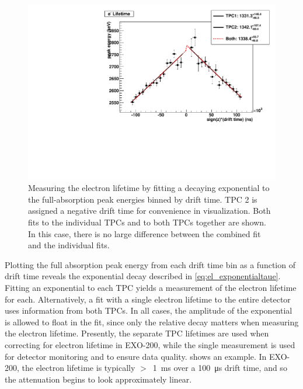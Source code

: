 \documentclass[herrin-thesis.tex]{subfiles}
\begin{document}
\begin{figure}[tbp]
\centering
\includegraphics[width=0.6\columnwidth]{./plots/el_run4228_fit.pdf}
\caption[A fit to the exponential attenuation of the full-absorption peak]{Measuring the electron lifetime by fitting a decaying exponential to the full-absorption peak energies binned by drift time. TPC 2 is assigned a negative drift time for convenience in visualization. Both fits to the individual TPCs and to both TPCs together are shown. In this case, there is no large difference between the combined fit and the individual fits.}
\label{fig:el_elfit}
\end{figure}

Plotting the full absorption peak energy from each drift time bin as a function of drift time reveals the exponential decay described in \cref{eq:el_exponentialtaue}. Fitting an exponential to each TPC yields a measurement of the electron lifetime for each. Alternatively, a fit with a single electron lifetime to the entire detector uses information from both TPCs. In all cases, the amplitude of the exponential is allowed to float in the fit, since only the relative decay matters when measuring the electron lifetime. Presently, the separate TPC lifetimes are used when correcting for electron lifetime in EXO-200, while the single measurement is used for detector monitoring and to ensure data quality.  shows an example. In EXO-200, the electron lifetime is typically \(>\)~\SI{1}{\ms} over a \SI{100}{\micro\s} drift time, and so the attenuation begins to look approximately linear.
\end{document}
